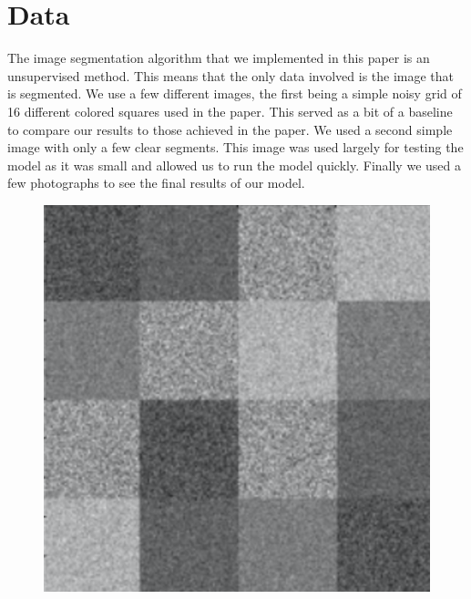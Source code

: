 \documentclass[11pt]{article}
\begin{document}
\section{Data}
The image segmentation algorithm that we implemented in this paper is an unsupervised method.
This means that the only data involved is the image that is segmented.
We use a few different images, the first being a simple noisy grid of 16 different colored squares used in the paper.
This served as a bit of a baseline to compare our results to those achieved in the paper.
We used a second simple image with only a few clear segments.
This image was used largely for testing the model as it was small and allowed us to run the model quickly.
Finally we used a few photographs to see the final results of our model.

\begin{figure}[!htb]
\begin{center}
\begin{multicols}{4}
    \includegraphics[height = \linewidth]{squares}\par

\end{multicols}
\end{center}
\end{figure}
\end{document}
